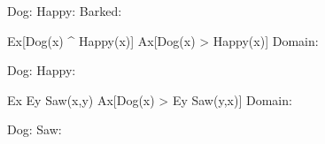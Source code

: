         Dog:    
        Happy:  
        Barked: 
        \endfirstordermodel
        \endanswer

\argument
 Ex[Dog(x) ^ Happy(x)]
\argumentline
 Ax[Dog(x) > Happy(x)]
\endargument
        \answer
        \firstordermodel
        Domain: 

        Dog:    
        Happy:  
        \endfirstordermodel
        \endanswer

\argument
 Ex Ey Saw(x,y)
\argumentline
 Ax[Dog(x) > Ey Saw(y,x)]
\endargument
        \answer
        \firstordermodel
        Domain: 

        Dog:    
        Saw:    
        \endfirstordermodel
        \endanswer

\endproblems
\bye
